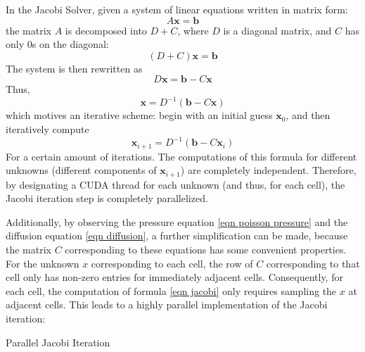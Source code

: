 In the Jacobi Solver, given a system of linear equations written in matrix form:
$$
A\textbf{x}=\textbf{b}
$$
the matrix $A$ is decomposed into $D+C$, where $D$ is a diagonal matrix, and $C$ has only $0$s on the diagonal:
$$
(D+C)\textbf{x}=\textbf{b}
$$
The system is then rewritten as 
$$
D\textbf{x}=\textbf{b} - C\textbf{x}
$$
Thus,
$$
\textbf{x}=D^{-1}(\textbf{b} - C\textbf{x})
$$
which motives an iterative scheme: begin with an initial guess $\textbf{x}_0$, and then iteratively compute
\begin{equation}
    \textbf{x}_{i+1} = D^{-1}(\textbf{b} - C\textbf{x}_{i})
    \label{eqn jacobi}
\end{equation}
For a certain amount of iterations. The computations of this formula for different unknowns (different components of $\textbf{x}_{i+1}$) are completely independent. Therefore, by designating a CUDA thread for each unknown (and thus, for each cell), the Jacobi iteration step is completely parallelized.

Additionally, by observing the pressure equation \ref{eqn poisson pressure} and the diffusion equation \ref{eqn diffusion}, a further simplification can be made, because the matrix $C$ corresponding to these equations has some convenient properties. For the unknown $x$ corresponding to each cell, the row of $C$ corresponding to that cell only has non-zero entries for immediately adjacent cells. Consequently, for each cell, the computation of formula \ref{eqn jacobi} only requires sampling the $x$ at adjacent cells. This leads to a highly parallel implementation of the Jacobi iteration:


\begin{algorithm}[H]
    \label{algo jacobi}
    \SetAlgoLined
    
    
    \caption{Parallel Jacobi Iteration}
\end{algorithm}

